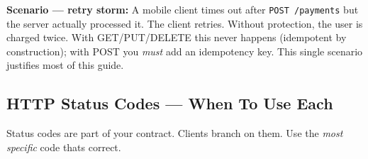 \documentclass[11pt]{article}
\begin{document}
\textbf{Scenario --- retry storm:} A mobile client times out after \texttt{POST\ /payments} but the server actually processed it. The client retries. Without protection, the user is charged twice. With GET/PUT/DELETE this never happens (idempotent by construction); with POST you \emph{must} add an idempotency key. This single scenario justifies most of this guide.

\subsection{HTTP Status Codes --- When To Use Each}\label{http-status-codes--when-to-use-each}

Status codes are part of your contract. Clients branch on them. Use the \emph{most specific} code that\textquotesingle s correct.
\end{document}
